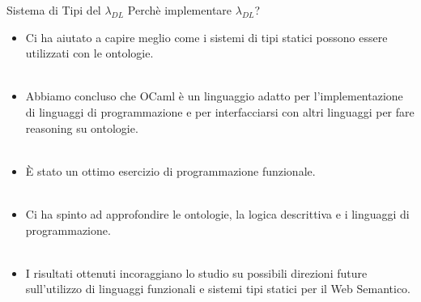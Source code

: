 \begin{frame}{Sistema di Tipi del $\lambda_{DL}$}
    Perch\`e implementare $\lambda_{DL}$?
    \begin{itemize}
        \item Ci ha aiutato a capire meglio come i sistemi di tipi statici possono essere utilizzati con le ontologie.\\~\\
        \item Abbiamo concluso che OCaml \`e un linguaggio adatto per l'implementazione di linguaggi di programmazione e per interfacciarsi con altri linguaggi per fare reasoning su ontologie. \\~\\
        \item \`E stato un ottimo esercizio di programmazione funzionale.\\~\\
        \item Ci ha spinto ad approfondire le ontologie, la logica descrittiva e i linguaggi di programmazione.\\~\\
        \item I risultati ottenuti incoraggiano lo studio su possibili direzioni future sull'utilizzo di linguaggi funzionali e sistemi tipi statici per il Web Semantico.
    \end{itemize}
\end{frame}